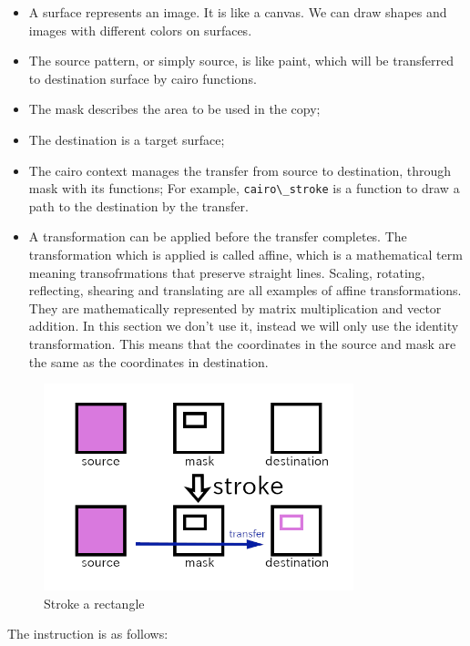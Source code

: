 \begin{itemize}
\tightlist
\item
  A surface represents an image. It is like a canvas. We can draw shapes
  and images with different colors on surfaces.
\item
  The source pattern, or simply source, is like paint, which will be
  transferred to destination surface by cairo functions.
\item
  The mask describes the area to be used in the copy;
\item
  The destination is a target surface;
\item
  The cairo context manages the transfer from source to destination,
  through mask with its functions; For example,
  \passthrough{\lstinline!cairo\_stroke!} is a function to draw a path
  to the destination by the transfer.
\item
  A transformation can be applied before the transfer completes. The
  transformation which is applied is called affine, which is a
  mathematical term meaning transofrmations that preserve straight
  lines. Scaling, rotating, reflecting, shearing and translating are all
  examples of affine transformations. They are mathematically
  represented by matrix multiplication and vector addition. In this
  section we don't use it, instead we will only use the identity
  transformation. This means that the coordinates in the source and mask
  are the same as the coordinates in destination.
\end{itemize}

\begin{figure}
\centering
\includegraphics[width=9cm,height=6cm]{../image/cairo.png}
\caption{Stroke a rectangle}
\end{figure}

The instruction is as follows:

